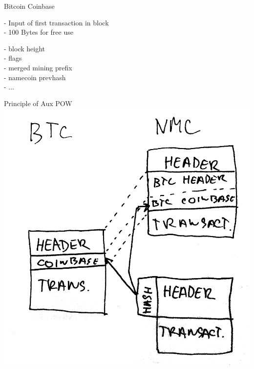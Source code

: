 \documentclass{beamer}
\begin{document}
\begin{frame}

    {\LARGE Bitcoin Coinbase}\\

    \vspace{5mm}

    - Input of first transaction in block\\
    - 100 Bytes for free use\\

    \vspace{5mm}

    - block height\\
    - flags\\
    - merged mining prefix\\
    - namecoin prevhash\\
    - ...\\

\end{frame}

\begin{frame}

    {\LARGE Principle of Aux POW}\\

    \includegraphics[scale=0.15]{img/principle_of_auxpow}

\end{frame}
\end{document}
